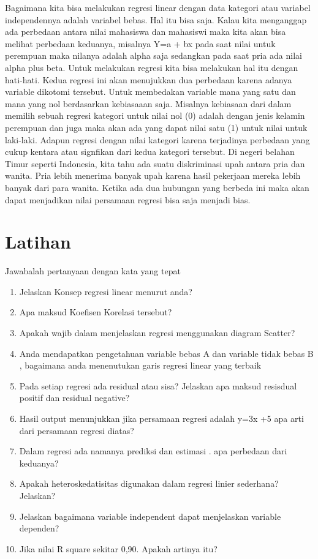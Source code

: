 \documentclass[
]{book}
\theoremstyle{definition}
\theoremstyle{definition}
\theoremstyle{definition}
\theoremstyle{definition}
\theoremstyle{remark}
\begin{document}
Bagaimana kita bisa melakukan regresi linear dengan data kategori atau variabel independennya adalah variabel bebas. Hal itu bisa saja. Kalau kita menganggap ada perbedaan antara nilai mahasiswa dan mahasiswi maka kita akan bisa melihat perbedaan keduanya, misalnya Y=a + bx pada saat nilai untuk perempuan maka nilanya adalah alpha saja sedangkan pada saat pria ada nilai alpha plus beta.
Untuk melakukan regresi kita bisa melakukan hal itu dengan hati-hati. Kedua regresi ini akan menujukkan dua perbedaan karena adanya variable dikotomi tersebut. Untuk membedakan variable mana yang satu dan mana yang nol berdasarkan kebiasaaan saja. Misalnya kebiasaan dari dalam memilih sebuah regresi kategori untuk nilai nol (0) adalah dengan jenis kelamin perempuan dan juga maka akan ada yang dapat nilai satu (1) untuk nilai untuk laki-laki.
Adapun regresi dengan nilai kategori karena terjadinya perbedaan yang cukup kentara atau signfikan dari kedua kategori tersebut. Di negeri belahan Timur seperti Indonesia, kita tahu ada suatu diskriminasi upah antara pria dan wanita. Pria lebih menerima banyak upah karena hasil pekerjaan mereka lebih banyak dari para wanita.
Ketika ada dua hubungan yang berbeda ini maka akan dapat menjadikan nilai persamaan regresi bisa saja menjadi bias.

\hypertarget{latihan}{%
\section*{Latihan}\label{latihan}}

Jawabalah pertanyaan dengan kata yang tepat

\begin{enumerate}
\def\labelenumi{\arabic{enumi}.}
\item
  Jelaskan Konsep regresi linear menurut anda?
\item
  Apa maksud Koefisen Korelasi tersebut?
\item
  Apakah wajib dalam menjelaskan regresi menggunakan diagram Scatter?
\item
  Anda mendapatkan pengetahuan variable bebas A dan variable tidak bebas B , bagaimana anda menenutukan garis regresi linear yang terbaik
\item
  Pada setiap regresi ada residual atau sisa? Jelaskan apa maksud resisdual positif dan residual negative?
\item
  Hasil output menunjukkan jika persamaan regresi adalah y=3x +5 apa arti dari persamaan regresi diatas?
\item
  Dalam regresi ada namanya prediksi dan estimasi . apa perbedaan dari keduanya?
\item
  Apakah heteroskedatisitas digunakan dalam regresi linier sederhana? Jelaskan?
\item
  Jelaskan bagaimana variable independent dapat menjelaskan variable dependen?
\item
  Jika nilai R square sekitar 0,90. Apakah artinya itu?
\end{enumerate}
\end{document}
